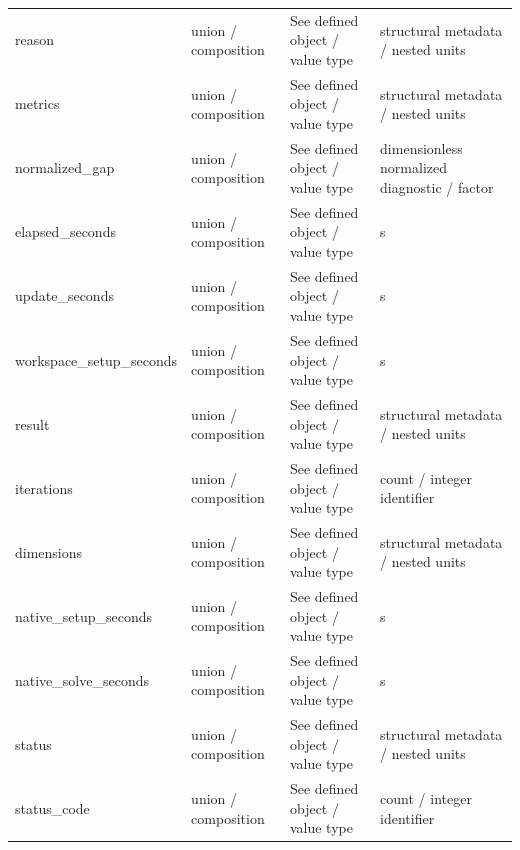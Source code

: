 \begin{longtable}{@{}>{\raggedright\arraybackslash}p{}>{\raggedright\arraybackslash}p{}>{\raggedright\arraybackslash}p{}>{\raggedright\arraybackslash}p{}@{}}
reason & union /\allowbreak{} composition & See defined object /\allowbreak{} value type & structural metadata /\allowbreak{} nested units\\
metrics & union /\allowbreak{} composition & See defined object /\allowbreak{} value type & structural metadata /\allowbreak{} nested units\\
normalized\_\allowbreak{}gap & union /\allowbreak{} composition & See defined object /\allowbreak{} value type & dimensionless normalized diagnostic /\allowbreak{} factor\\
elapsed\_\allowbreak{}seconds & union /\allowbreak{} composition & See defined object /\allowbreak{} value type & s\\
update\_\allowbreak{}seconds & union /\allowbreak{} composition & See defined object /\allowbreak{} value type & s\\
workspace\_\allowbreak{}setup\_\allowbreak{}seconds & union /\allowbreak{} composition & See defined object /\allowbreak{} value type & s\\
result & union /\allowbreak{} composition & See defined object /\allowbreak{} value type & structural metadata /\allowbreak{} nested units\\
iterations & union /\allowbreak{} composition & See defined object /\allowbreak{} value type & count /\allowbreak{} integer identifier\\
dimensions & union /\allowbreak{} composition & See defined object /\allowbreak{} value type & structural metadata /\allowbreak{} nested units\\
native\_\allowbreak{}setup\_\allowbreak{}seconds & union /\allowbreak{} composition & See defined object /\allowbreak{} value type & s\\
native\_\allowbreak{}solve\_\allowbreak{}seconds & union /\allowbreak{} composition & See defined object /\allowbreak{} value type & s\\
status & union /\allowbreak{} composition & See defined object /\allowbreak{} value type & structural metadata /\allowbreak{} nested units\\
status\_\allowbreak{}code & union /\allowbreak{} composition & See defined object /\allowbreak{} value type & count /\allowbreak{} integer identifier\\
\end{longtable}\endgroup
